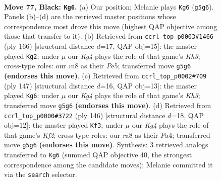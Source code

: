 \documentclass[11pt]{article}
\begin{document}
\clearpage

\begin{figure}[p]\centering
\begin{subfigure}{0.46\textwidth}\centering
\resizebox{\linewidth}{!}{%
\newchessgame
\chessboard[
  setfen={R7/4rp2/2R1p3/6k1/P3P3/5P1K/8/8 b - - 46 77},
  showmover=false,
  pgfstyle=straightmove, color=movearrow, markmove={g5-g6}
]}
\caption{}
\end{subfigure}\hfill
\begin{subfigure}{0.46\textwidth}\centering
\resizebox{\linewidth}{!}{%
\newchessgame
\chessboard[
  setfen={8/5pk1/4p3/4P3/1R3PP1/7K/8/5r2 w - - 83 84},
  showmover=false,
  pgfstyle=straightmove, color=movearrow, markmove={h3-g2}
]}
\caption{}
\end{subfigure}
\\[4pt]
\begin{subfigure}{0.46\textwidth}\centering
\resizebox{\linewidth}{!}{%
\newchessgame
\chessboard[
  setfen={8/4R3/r3p2k/5p2/5P2/6P1/5K2/8 b - - 7 74},
  showmover=false,
  pgfstyle=straightmove, color=movearrow, markmove={h6-g6}
]}
\caption{}
\end{subfigure}\hfill
\begin{subfigure}{0.46\textwidth}\centering
\resizebox{\linewidth}{!}{%
\newchessgame
\chessboard[
  setfen={8/8/p5p1/p7/P2k2rP/1P5R/5K2/8 w - - 2 74},
  showmover=false,
  pgfstyle=straightmove, color=movearrow, markmove={f2-f3}
]}
\caption{}
\end{subfigure}
\caption{\textbf{Move 77, Black: \texttt{Kg6}.} (a) Our position; Melanie plays \texttt{Kg6} (\texttt{g5g6}). Panels (b)--(d) are the retrieved master positions whose correspondence most drove this move (highest QAP objective among those that transfer to it). (b) Retrieved from \texttt{ccrl\_top\_p0003\#1466} (ply 166) [structural distance $d$=17, QAP obj=15]: the master played \texttt{Kg2}; under $\mu$ our \emph{Kg4} plays the role of that game's \emph{Kh3}; cross-type roles: our \emph{r}a8 as their \emph{P}e5; transferred move \texttt{g5g6} \textbf{(endorses this move)}. (c) Retrieved from \texttt{ccrl\_top\_p0002\#709} (ply 147) [structural distance $d$=16, QAP obj=13]: the master played \texttt{Kg6}; under $\mu$ our \emph{Kg4} plays the role of that game's \emph{Kh3}; transferred move \texttt{g5g6} \textbf{(endorses this move)}. (d) Retrieved from \texttt{ccrl\_top\_p0000\#3722} (ply 146) [structural distance $d$=18, QAP obj=12]: the master played \texttt{Kf3}; under $\mu$ our \emph{Kg4} plays the role of that game's \emph{Kf2}; cross-type roles: our \emph{r}a8 as their \emph{P}a4; transferred move \texttt{g5g6} \textbf{(endorses this move)}. Synthesis: 3 retrieved analogs transferred to \texttt{Kg6} (summed QAP objective 40, the strongest correspondence among the candidate moves); Melanie committed it via the \texttt{search} selector.}
\label{fig:thought-m153}
\end{figure}
\end{document}
